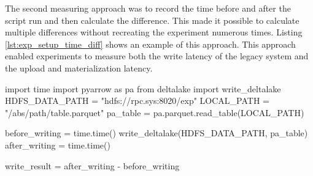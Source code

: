 The second measuring approach was to record the time before and after the script run and then calculate the difference. This made it possible to calculate multiple differences without recreating the experiment numerous times. Listing \ref{lst:exp_setup_time_diff} shows an example of this approach. This approach enabled experiments to measure both the write latency of the legacy system and the upload and materialization latency.

\begin{minipage}{\linewidth}
\begin{python}[caption={[Measuring latency using the time difference]A simple time difference approach to measure the time required to write a Delta Lake table to \gls{HopsFS}.}, label={lst:exp_setup_time_diff}]
import time
import pyarrow as pa
from deltalake import write_deltalake
HDFS_DATA_PATH = "hdfs://rpc.sys:8020/exp" 
LOCAL_PATH = "/abs/path/table.parquet"
pa_table = pa.parquet.read_table(LOCAL_PATH)

before_writing = time.time()
write_deltalake(HDFS_DATA_PATH, pa_table)
after_writing = time.time()

write_result = after_writing - before_writing
\end{python}
\end{minipage}

